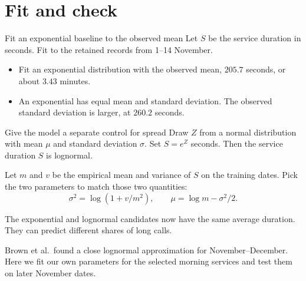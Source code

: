 \documentclass{beamer}
\begin{document}
\section{Fit and check}

\begin{frame}{Fit an exponential baseline to the observed mean}
  Let $S$ be the service duration in seconds. Fit to the retained
  records from 1--14 November.

  \vspace{0.65em}
  \begin{itemize}
    \item Fit an exponential distribution with the observed mean,
      $205.7$ seconds, or about $3.43$ minutes.
    \item An exponential has equal mean and standard deviation. The
      observed standard deviation is larger, at $260.2$ seconds.
  \end{itemize}

\end{frame}

\begin{frame}{Give the model a separate control for spread}
  \small
  Draw $Z$ from a normal distribution with mean $\mu$ and standard deviation
  $\sigma$. Set $S=e^Z$ seconds. Then the service duration $S$ is lognormal.

  \vspace{0.5em}
  Let $m$ and $v$ be the empirical mean and variance of $S$ on the
  training dates. Pick the two parameters to match those two quantities:
  \[
    \sigma^2=\log(1+v/m^2), \qquad \mu=\log m-\sigma^2/2.
  \]

  The exponential and lognormal candidates now have the same average
  duration. They can predict different shares of long calls.

  \vspace{0.45em}
  {\scriptsize
  Brown et al.\ found a close lognormal approximation for November--December.
  Here we fit our own parameters for the selected morning services and test them
  on later November dates.}
\end{frame}
\end{document}
